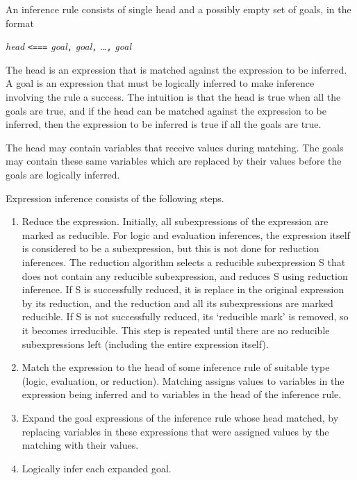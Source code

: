 \documentclass[12pt]{article}
\begin{document}
An inference rule consists of single head and a possibly empty
set of goals, in the format

\begin{center}
{\em head} \verb|<===| {\em goal}\verb|,| {\em goal}\verb|,|
			\ldots\verb|,| {\em goal}
\end{center}

The head is
an expression that is matched against the expression to be inferred.
A goal is an expression that must be logically inferred to make
inference involving the rule a success.  The intuition is that
the head is true when all the goals are true, and if the head
can be matched against the expression to be inferred, then
the expression to be inferred is true if all the goals are true.

The head may contain variables that receive values during matching.
The goals may contain these same variables which are replaced by
their values before the goals are logically inferred.

Expression inference consists of the following steps.

\begin{enumerate}

\item Reduce the expression.  Initially, all subexpressions of the
expression are marked as reducible.  For logic and evaluation inferences,
the expression itself is considered to be a subexpression, but this is
not done for reduction inferences.  The reduction algorithm
selects a reducible subexpression S that does not contain any reducible
subexpression, and reduces S using reduction inference.  If S is successfully
reduced, it is replace in the original expression by its reduction, and
the reduction and all its subexpressions are marked reducible.  If S is
not successfully reduced, its `reducible mark' is removed, so it becomes
irreducible.  This step is repeated until there are no reducible subexpressions
left (including the entire expression itself).

\item

Match the expression to the head of some inference rule of suitable type
(logic, evaluation, or reduction).  Matching assigns values to variables
in the expression being inferred and to variables in the head of the
inference rule.

\item
Expand the goal expressions of the inference rule whose head matched,
by replacing variables in these expressions that were assigned values
by the matching with their values.

\item
Logically infer each expanded goal.

\end{enumerate}
\end{document}
